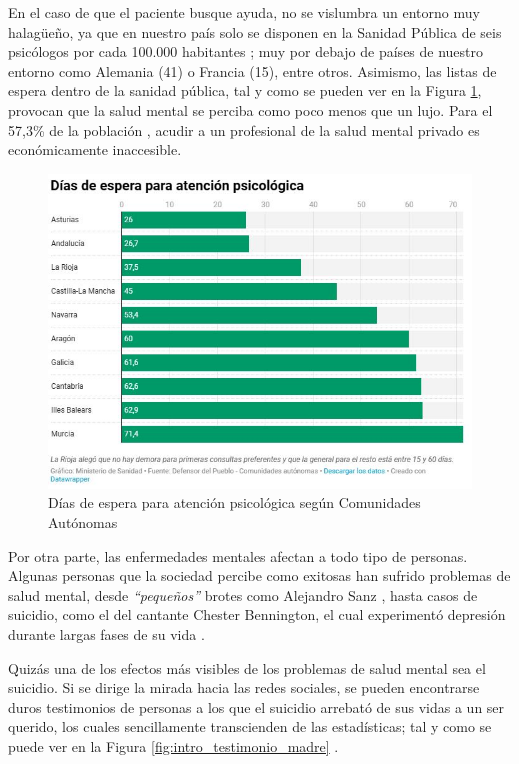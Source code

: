     
    En el caso de que el paciente busque ayuda, no se vislumbra un entorno muy halagüeño, ya que en nuestro país solo se disponen en la Sanidad Pública de seis psicólogos por cada 100.000 habitantes \cite{antolin_listas_2023}; muy por debajo de países de nuestro entorno como Alemania (41) o Francia (15), entre otros. Asimismo, las listas de espera dentro de la sanidad pública, tal y como se pueden ver en la Figura \ref{fig:intro:dias_espera}, provocan que la salud mental se perciba como poco menos que un lujo. Para el 57,3\% de la población \cite{comunicacion_cuatro_2023}, acudir a un profesional de la salud mental privado es económicamente inaccesible.
    
    \begin{figure}[h]
        \centering
        \includegraphics[width=0.75\linewidth]{figures/dias espera.JPG}
        \caption[Días de espera para atención psicológica según Comunidades Autónomas]{Días de espera para atención psicológica según Comunidades Autónomas \cite{asuar_gallego_recurrir_2021}}
        \label{fig:intro:dias_espera}
    \end{figure}

    Por otra parte, las enfermedades mentales afectan a todo tipo de personas. Algunas personas que la sociedad percibe como exitosas han sufrido problemas de salud mental, desde \textit{``pequeños''} brotes como Alejandro Sanz \cite{lopez_chicon_que_2023} \cite{riano_alejandro_2023}, hasta casos de suicidio, como el del cantante Chester Bennington, el cual experimentó depresión durante largas fases de su vida \cite{el_universal_nada_2020} \cite{gambin_historia_2022}.

    Quizás una de los efectos más visibles de los problemas de salud mental sea el suicidio. Si se dirige la mirada hacia las redes sociales, se pueden encontrarse duros testimonios de personas a los que el suicidio arrebató de sus vidas a un ser querido, los cuales sencillamente transcienden de las estadísticas; tal y como se puede ver en la Figura \ref{fig:intro_testimonio_madre} .
    
